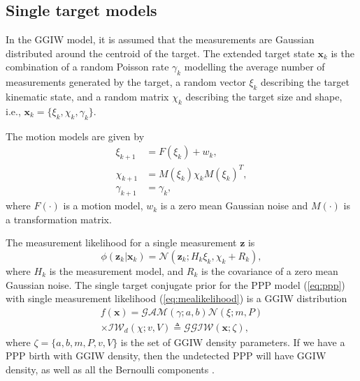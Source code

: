 \documentclass[journal]{IEEEtran}
\begin{document}

\subsection{Single target models}
In the GGIW model, it is assumed that the measurements are Gaussian distributed around the centroid of the target. The extended target state $\mathbf{x}_k$ is the combination of a random Poisson rate $\gamma_k$ modelling the average number of measurements generated by the target, a random vector $\xi_k$ describing the target kinematic state, and a random matrix $\chi_k$ describing the target size and shape, i.e., $\mathbf{x}_k=\{\xi_{k},\chi_{k},\gamma_{k}\}$. 

The motion models are given by
\begin{subequations}
\begin{align}
    \xi_{k+1} &= F(\xi_k) + w_k,\\
    \chi_{k+1} &= M(\xi_k)\chi_kM(\xi_k)^T,\\
    \gamma_{k+1} &= \gamma_k,
\end{align}
\end{subequations}
where $F(\cdot)$ is a motion model, $w_k$ is a zero mean Gaussian noise and $M(\cdot)$ is a transformation matrix. 

The measurement likelihood for a single measurement $\mathbf{z}$ is
\begin{equation}
    \phi(\mathbf{z}_k|\mathbf{x}_k) = \mathcal{N}(\mathbf{z}_k;H_k\xi_k,\chi_k+R_k),
    \label{eq:mealikelihood}
\end{equation}
where $H_k$ is the measurement model, and $R_k$ is the covariance of a zero mean Gaussian noise. The single target conjugate prior for the PPP model (\ref{eq:ppp}) with single measurement
likelihood (\ref{eq:mealikelihood}) is a GGIW distribution \cite{randomMatrix,randomMatrix2}
\begin{multline}
f(\mathbf{x}) = \mathcal{GAM}(\gamma;a,b)\mathcal{N}(\xi;m,P)\\ \times\mathcal{IW}_d(\chi;v,V) \triangleq \mathcal{GGIW}(\mathbf{x};\zeta),
\end{multline}
where $\zeta = \{a,b,m,P,v,V\}$ is the set of GGIW density parameters. If we have a PPP birth with GGIW density, then the undetected PPP will have GGIW density, as well as all the Bernoulli components \cite{pmbmextended2}.
\end{document}
